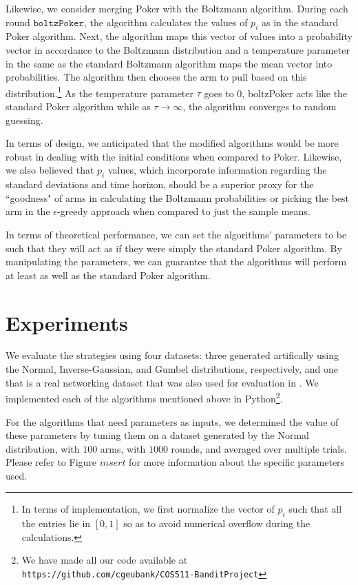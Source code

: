 \documentclass[12pt]{article}
\begin{document}
Likewise, we consider merging Poker with the Boltzmann algorithm. During each round $\texttt{boltzPoker}$, the algorithm calculates the values of $p_{i}$ as in the standard Poker algorithm. Next, the algorithm maps this vector of values into a probability vector in accordance to the Boltzmann distribution and a temperature parameter in the same as the standard Boltzmann algorithm maps the mean vector into probabilities. The algorithm then chooses the arm to pull based on this distribution.\footnote{In terms of implementation, we first normalize the vector of $p_{i}$ such that all the entries lie in $[0,1]$ so as to avoid numerical overflow during the calculations.} As the temperature parameter $\tau$ goes to 0, boltzPoker acts like the standard Poker algorithm while as $\tau \to \infty$, the algorithm converges to random guessing.

In terms of design, we anticipated that the modified algorithms would be more robust in dealing with the initial conditions when compared to Poker. Likewise,  we also believed that $p_{i}$ values, which incorporate information regarding the standard deviations and time horizon, should be a superior proxy for the ``goodness" of arms in calculating the Boltzmann probabilities or picking the best arm in the $\epsilon$-greedy approach when compared to just the sample means.

In terms of theoretical performance, we can set the algorithms' parameters to be such that they will act as if they were simply the standard Poker algorithm. By manipulating the parameters, we can guarantee that the algorithms will perform at least as well as the standard Poker algorithm. 

\section{Experiments}

We evaluate the strategies using four datasets: three generated artifically using the Normal, Inverse-Gaussian, and Gumbel distributions, respectively,
and one that is a real networking dataset that was also used for evaluation in \cite{Mohri}. 
We implemented each of the algorithms mentioned above in Python\footnote{We have made all our code available at \texttt{https://github.com/cgeubank/COS511-BanditProject}}. 

For the algorithms that need parameters as inputs, we determined the value of these parameters by tuning them on a dataset generated by the Normal distribution, with $100$ arms,
with $1000$ rounds, and averaged over multiple trials.  Please refer to Figure $insert$ for more information about the specific parameters used.
\end{document}
